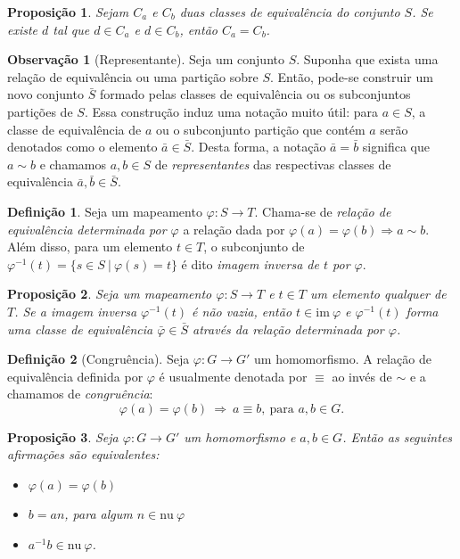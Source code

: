 \documentclass[a4paper,12pt]{report}
\theoremstyle{plain}
\newtheorem{proposicao}{Proposição}[section]
\theoremstyle{definition}
\newtheorem{definicao}{Definição}[section]
\newtheorem{observacao}{Observação}[section]
\begin{document}
\begin{proposicao}
	Sejam \(C_a\) e \(C_b\) duas classes de equivalência do conjunto \(S\). Se existe \(d\) tal que \(d\in C_a\) e \(d\in C_b\), então \(C_a = C_b\).
\end{proposicao}

\begin{observacao}[Representante]
	Seja um conjunto \(S\). Suponha que exista uma relação de equivalência
	ou uma partição sobre \(S\). Então, pode-se construir um novo conjunto
	\(\bar{S}\) formado pelas classes de equivalência ou os subconjuntos
	partições de \(S\). Essa construção induz uma notação muito útil: para
	\(a\in S\), a classe de equivalência de \(a\) ou o subconjunto partição
	que contém \(a\) serão denotados como o elemento
	\(\bar{a} \in \bar{S}\). Desta forma, a notação \(\bar{a} = \bar{b}\)
	significa que \(a \sim b\) e chamamos \(a,b \in S\) de
	\emph{representantes} das respectivas classes de equivalência
	\(\bar{a}, \bar{b} \in \bar{S}\).
\end{observacao}

\begin{definicao}
	Seja um mapeamento \(\varphi: S \longrightarrow T\).
	Chama-se de \emph{relação de equivalência determinada por \(\varphi\)} a
	relação dada por \(\varphi(a) = \varphi(b) \Rightarrow a \sim b\). Além
	disso, para um elemento \(t\in T\), o subconjunto de
	\(\varphi^{-1}(t) = \{s \in S\ | \ \varphi(s) = t\}\) é dito
	\emph{imagem inversa de \(t\) por \(\varphi\)}.
\end{definicao}

\begin{proposicao}
	Seja um mapeamento \(\varphi: S \longrightarrow T\)
	e \(t \in T\) um elemento qualquer de \(T\). Se a imagem inversa
	\(\varphi^{-1}(t)\) é não vazia, então \(t \in \text{im}\ \varphi\) e
	\(\varphi^{-1}(t)\) forma uma classe de equivalência
	\(\bar{\varphi}\in \bar{S}\) através da relação determinada por
	\(\varphi\).	
\end{proposicao}

\begin{definicao}[Congruência]
	Seja \(\varphi: G\longrightarrow G'\) um
	homomorfismo. A relação de equivalência definida por \(\varphi\) é
	usualmente denotada por \(\equiv\) ao invés de \(\sim\) e a chamamos de
	\emph{congruência}:
	\[\varphi(a) = \varphi(b) \ \Rightarrow \ a \equiv b, \ \text{para }a,b \in G.\]	
\end{definicao}

\begin{proposicao}
	Seja \(\varphi: G\longrightarrow G'\) um
	homomorfismo e \(a,b \in G\). Então as seguintes afirmações são
	equivalentes:
	\begin{itemize}
		\item
		\(\varphi(a) = \varphi(b)\)
		\item
		\(b = an\), para algum \(n\in \text{nu} \ \varphi\)
		\item
		\(a^{-1}b \in \text{nu} \ \varphi\).
	\end{itemize}	
\end{proposicao}
\end{document}
